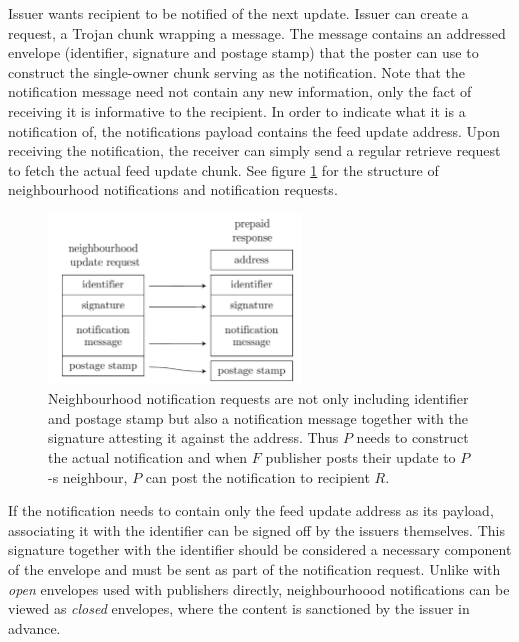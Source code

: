 Issuer wants recipient to be notified of the next update. Issuer can create a  request,  a Trojan chunk wrapping a message. The message contains an addressed envelope (identifier, signature and postage stamp) that the poster can use to construct the single-owner chunk serving as the notification. Note that the notification message need not contain any new information, only the fact of receiving it is informative to the recipient. In order to indicate what it is a notification of, the notifications payload contains the feed update address. Upon receiving the notification, the receiver can simply send a regular retrieve request to fetch the actual feed update chunk. See figure \ref{fig:notification-from-neighbourhood} for the structure of neighbourhood notifications and notification requests.
                                

\begin{figure}[htbp]
\centering
\includegraphics[width=0.6\textwidth]{fig/notification-from-neighbourhood.pdf}
\caption[Neighbourhood notifications \statusgreen]{Neighbourhood notification requests are not only including identifier and postage stamp but also a notification message together with the signature attesting it against the address. Thus $P$ needs to construct the actual notification and when $F$ publisher posts their update to $P$-s neighbour, $P$ can post the notification to recipient $R$.}
\label{fig:notification-from-neighbourhood}
\end{figure}

If the notification needs to contain only the feed update address as its payload, associating it with the identifier can be signed off by the issuers themselves. This signature together with the identifier should be considered a necessary component of the  envelope and must be sent as part of the notification request.
Unlike with \emph{open} envelopes used with publishers directly, neighbourhoood notifications can be viewed as \emph{closed} envelopes, where the content is sanctioned by the issuer in advance. 

